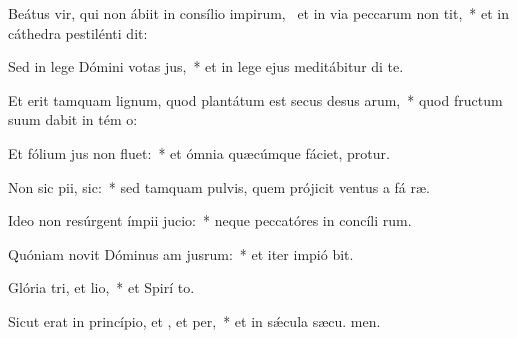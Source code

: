 \item Beátus vir, qui non ábiit in consílio impirum,~\pscross{} et in via peccarum non tit,~* et in cáthedra pestilénti  dit:
\item Sed in lege Dómini votas jus,~* et in lege ejus meditábitur di  te.
\item Et erit tamquam lignum, quod plantátum est secus desus arum,~* quod fructum suum dabit in tém o:
\item Et fólium jus non fluet:~* et ómnia quæcúmque fáciet, protur.
\item Non sic pii,  sic:~* sed tamquam pulvis, quem prójicit ventus a fá ræ.
\item Ideo non resúrgent ímpii  jucio:~* neque peccatóres in concíli rum.
\item Quóniam novit Dóminus am jusrum:~* et iter impió bit.
\item Glória tri, et lio,~* et Spirí to.
\item Sicut erat in princípio, et , et per,~* et in sǽcula sæcu. men.
